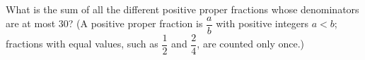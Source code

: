What is the sum of all the different positive proper fractions whose denominators are at most $30$? (A positive proper fraction is $\dfrac ab$ with positive integers $a<b$; fractions with equal values, such as $\dfrac12$ and $\dfrac24$, are counted only once.)
